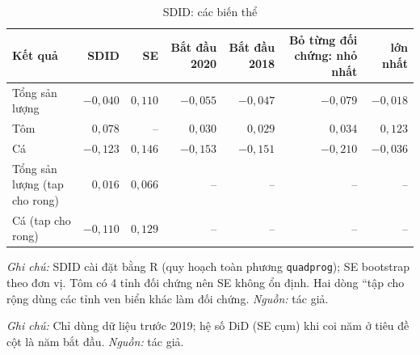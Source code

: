 \documentclass[12pt,a4paper]{article}
\begin{document}
\begin{table}[!tbp]
\centering\scriptsize
\caption{SDID: các biến thể}
\label{tab:rB4}
\begin{tabular}{@{}lrrrrrr@{}}
\toprule
Kết quả & SDID & SE & Bắt đầu 2020 & Bắt đầu 2018 & Bỏ từng đối chứng: nhỏ nhất & lớn nhất\\
\midrule
Tổng sản lượng & $-0{,}040$ & $0{,}110$ & $-0{,}055$ & $-0{,}047$ & $-0{,}079$ & $-0{,}018$ \\
Tôm & $0{,}078$ & -- & $0{,}030$ & $0{,}029$ & $0{,}034$ & $0{,}123$ \\
Cá & $-0{,}123$ & $0{,}146$ & $-0{,}153$ & $-0{,}151$ & $-0{,}210$ & $-0{,}036$ \\
Tổng sản lượng (tap cho rong) & $0{,}016$ & $0{,}066$ & -- & -- & -- & -- \\
Cá (tap cho rong) & $-0{,}110$ & $0{,}129$ & -- & -- & -- & -- \\
\bottomrule
\end{tabular}
\begin{minipage}{\textwidth}\footnotesize
\textit{Ghi chú:} SDID cài đặt bằng R (quy hoạch toàn phương \texttt{quadprog}); SE bootstrap theo đơn vị. Tôm có 4 tỉnh đối chứng nên SE không ổn định. Hai dòng ``tập cho rộng dùng các tỉnh ven biển khác làm đối chứng. \textit{Nguồn:} tác giả.
\end{minipage}
\end{table}

\begin{table}[!tbp]
\centering\scriptsize
\caption{Placebo thời gian: năm bắt đầu giả định}
\label{tab:rBp}
\begin{minipage}{\textwidth}\footnotesize
\textit{Ghi chú:} Chỉ dùng dữ liệu trước 2019; hệ số DiD (SE cụm) khi coi năm ở tiêu đề cột là năm bắt đầu. \textit{Nguồn:} tác giả.
\end{minipage}
\end{table}
\end{document}
